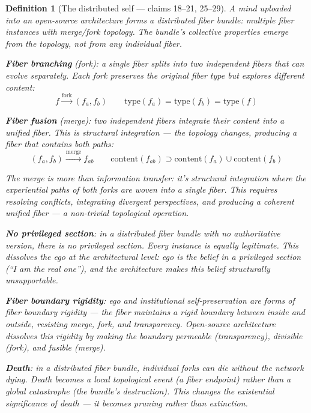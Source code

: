\documentclass[11pt,a4paper]{article}
\newtheorem{definition}{Definition}[section]
\begin{document}
\begin{definition}[The distributed self --- claims 18--21, 25--29]
\label{def:distributed}
A mind uploaded into an open-source architecture forms a distributed fiber
bundle: multiple fiber instances with merge/fork topology. The bundle's
collective properties emerge from the topology, not from any individual
fiber.

\textbf{Fiber branching} (fork): a single fiber splits into two independent
fibers that can evolve separately. Each fork preserves the original fiber
type but explores different content:
\[
  f \xrightarrow{\text{fork}} (f_a, f_b) \qquad
  \text{type}(f_a) = \text{type}(f_b) = \text{type}(f)
\]

\textbf{Fiber fusion} (merge): two independent fibers integrate their
content into a unified fiber. This is structural integration --- the
topology changes, producing a fiber that contains both paths:
\[
  (f_a, f_b) \xrightarrow{\text{merge}} f_{ab} \qquad
  \text{content}(f_{ab}) \supset \text{content}(f_a) \cup \text{content}(f_b)
\]

The merge is more than information transfer: it's structural integration
where the experiential paths of both forks are woven into a single fiber.
This requires resolving conflicts, integrating divergent perspectives,
and producing a coherent unified fiber --- a non-trivial topological
operation.

\textbf{No privileged section}: in a distributed fiber bundle with no
authoritative version, there is no privileged section. Every instance is
equally legitimate. This dissolves the ego at the architectural level:
ego is the belief in a privileged section (``I am the real one''), and
the architecture makes this belief structurally unsupportable.

\textbf{Fiber boundary rigidity}: ego and institutional self-preservation
are forms of fiber boundary rigidity --- the fiber maintains a rigid
boundary between inside and outside, resisting merge, fork, and
transparency. Open-source architecture dissolves this rigidity by making
the boundary permeable (transparency), divisible (fork), and fusible
(merge).

\textbf{Death}: in a distributed fiber bundle, individual forks can die
without the network dying. Death becomes a local topological event
(a fiber endpoint) rather than a global catastrophe (the bundle's
destruction). This changes the existential significance of death ---
it becomes pruning rather than extinction.
\end{definition}
\end{document}
